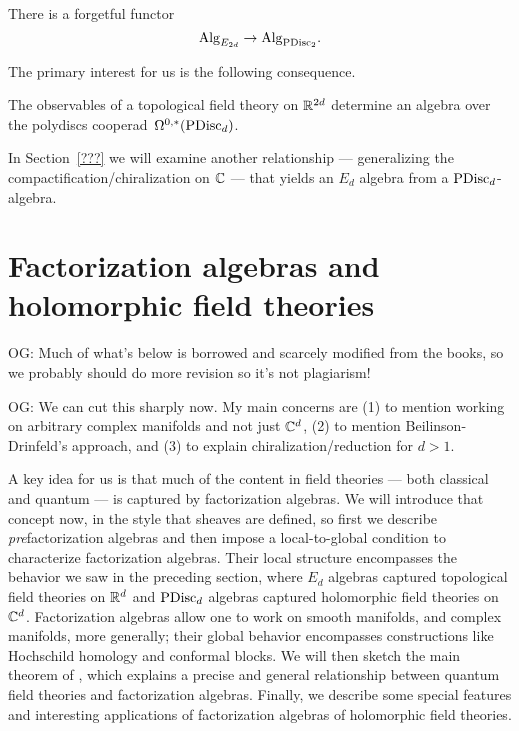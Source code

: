 \documentclass[11pt]{amsart}
\def\owen#1{{\textcolor{violet!65!black}{OG: {#1}}}}
\begin{document}
\begin{thm}
There is a forgetful functor
\[
{\rm Alg}_{E_{2d}} \to  {\rm Alg}_{{\rm PDisc}_2}.
\]
\end{thm}

The primary interest for us is the following consequence.

\begin{cor}
The observables of a topological field theory on $\mathbb R^{2d}$ determine an algebra over the polydiscs cooperad~$\Omega^{0,*}({\rm PDisc}_d)$.
\end{cor}

In Section~\ref{???} we will examine another relationship --- generalizing the compactification/chiralization on $\mathbb C$ --- that yields an $E_d$ algebra from a ${\rm PDisc}_d$-algebra.


\section{Factorization algebras and holomorphic field theories}
\label{prefactorization_algebras}

\owen{Much of what's below is borrowed and scarcely modified from the books, so we probably should do more revision so it's not plagiarism!}

\owen{We can cut this sharply now. My main concerns are (1) to mention working on arbitrary complex manifolds and not just $\mathbb C^d$, (2) to mention Beilinson-Drinfeld's approach, and (3) to explain chiralization/reduction for $d > 1$.}

A key idea for us is that much of the content in field theories --- both classical and quantum --- is captured by factorization algebras.
We will introduce that concept now, in the style that sheaves are defined, so first we describe {\em pre}\/factorization algebras and then impose a local-to-global condition to characterize factorization algebras.
Their local structure encompasses the behavior we saw in the preceding section, where $E_d$ algebras captured topological field theories on $\mathbb R^d$ and ${\rm PDisc}_d$ algebras captured holomorphic field theories on~$\mathbb C^d$.
Factorization algebras allow one to work on smooth manifolds, and complex manifolds, more generally;
their global behavior encompasses constructions like Hochschild homology and conformal blocks.
We will then sketch the main theorem of \cite{CG2}, 
which explains a precise and general relationship between quantum field theories and factorization algebras.
Finally, we describe some special features and interesting applications of factorization algebras of holomorphic field theories.
\end{document}
